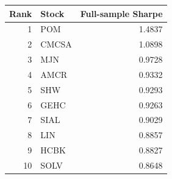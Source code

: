 \begin{tabular}{rlr}
\toprule
Rank & Stock & Full-sample Sharpe \\
\midrule
 1 & POM & 1.4837 \\
 2 & CMCSA & 1.0898 \\
 3 & MJN & 0.9728 \\
 4 & AMCR & 0.9332 \\
 5 & SHW & 0.9293 \\
 6 & GEHC & 0.9263 \\
 7 & SIAL & 0.9029 \\
 8 & LIN & 0.8857 \\
 9 & HCBK & 0.8827 \\
10 & SOLV & 0.8648 \\
\bottomrule
\end{tabular}
